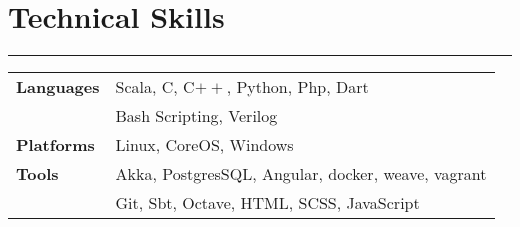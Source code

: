 \documentclass[a4paper]{article}
\begin{document}
 \section*{Technical Skills}
 \hrule
 \vspace{3mm}
  \begin{tabular}{@{}m{4.0cm}m{13cm}@{}}
   \textbf{\textrm{Languages}} & 
Scala, C, C$++$, Python, Php, Dart\\
& Bash Scripting, Verilog\\ 
  \textbf{\textrm{Platforms}} &
  Linux, CoreOS, Windows\\
  
  \textbf{\textrm{Tools}} &
  Akka, PostgresSQL, Angular, docker, weave, vagrant\\
  & Git, Sbt, Octave, HTML, SCSS, JavaScript\\
  \end{tabular}
\end{document}
